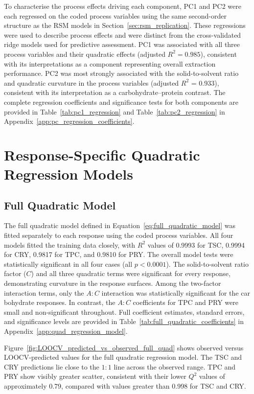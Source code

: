 \documentclass[MScDSA]{uccthesis}
\begin{document}
To characterise the process effects driving each component, PC1 and PC2 were each regressed on the coded process variables using the same second-order structure as the RSM models in Section~\ref{sec:rsm_replication}. These regressions were used to describe process effects and were distinct from the cross-validated ridge models used for predictive assessment.
PC1 was associated with all three process variables and their quadratic effects (adjusted $R^2 = 0.985$), consistent with its interpretations as a component representing overall extraction performance. PC2 was most strongly associated with the solid-to-solvent ratio and quadratic curvature in the process variables (adjusted $R^2$ = 0.933), consistent with its interpretation as a carbohydrate--protein contrast. The complete regression coefficients and significance tests for both components are provided in Table~\ref{tab:pc1_regression} and Table~\ref{tab:pc2_regression} in Appendix~\ref{app:pc_regression_coefficients}.


\section{Response-Specific Quadratic Regression Models}
\label{sec:response_specific_quadratic_regression}
\subsection{Full Quadratic Model}
\label{sec:full_quad_model}
The full quadratic model defined in Equation~\ref{eq:full_quadratic_model} was fitted separately to each response using the coded process variables. All four models fitted the training data closely, with $R^2$ values of 0.9993 for TSC, 0.9994 for CRY, 0.9817 for TPC, and 0.9810 for PRY. The overall model tests were statistically significant in all four cases (all $p<0.0001$). The solid-to-solvent ratio factor ($C$) and all three quadratic terms were significant for every response, demonstrating curvature in the response surfaces. Among the two-factor interaction terms, only the $A:C$ interaction was statistically significant for the car bohydrate responses. In contrast, the $A:C$ coefficients for TPC and PRY were small and non-significant throughout. Full coefficient estimates, standard errors, and significance levels are provided in Table~\ref{tab:full_quadratic_coefficients} in Appendix~\ref{app:quad_regression_model}.

Figure~\ref{fig:LOOCV_predicted_vs_observed_full_quad} shows observed versus LOOCV-predicted values for the full quadratic regression model. The TSC and CRY predictions lie close to the $1{:}1$ line across the observed range. TPC and PRY show visibly greater scatter, consistent with their lower $Q^2$ values of approximately 0.79, compared with values greater than 0.998 for TSC and CRY.
\end{document}
